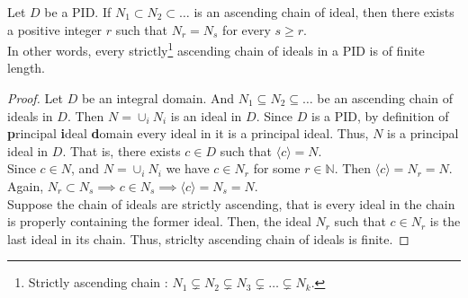 \begin{lemma}
	Let $D$ be a PID.
	If $N_1 \subset N_2 \subset \dots$ is an ascending chain of ideal, then there exists a positive integer $r$ such that $N_r = N_s$ for every $s \ge r$.\\

	In other words, every strictly\dag\footnote{
		Strictly ascending chain : $N_1 \subsetneq N_2 \subsetneq N_3 \subsetneq \dots \subsetneq N_k$.}
	ascending chain of ideals in a PID is of finite length.
\end{lemma}
\begin{proof}
	Let $D$ be an integral domain.
	And $N_1 \subseteq N_2 \subseteq \dots$ be an ascending chain of ideals in $D$.
	Then $N = \cup_i N_i$ is an ideal in $D$.
	Since $D$ is a PID, by definition of \textbf{p}rincipal \textbf{i}deal \textbf{d}omain every ideal in it is a principal ideal.
	Thus, $N$ is a principal ideal in $D$.
	That is, there exists $c \in D$ such that $\langle c \rangle = N$.\\

	Since $c \in N$, and $N = \cup_i N_i$ we have $c \in N_r$ for some $r \in \mathbb{N}$.
	Then $\langle c \rangle = N_r = N$.
	Again, $N_r \subset N_s \implies c \in N_s \implies \langle c \rangle = N_s = N$.\\

	Suppose the chain of ideals are strictly ascending, that is every ideal in the chain is properly containing the former ideal.
	Then, the ideal $N_r$ such that $c \in N_r$ is the last ideal in its chain.
	Thus, striclty ascending chain of ideals is finite.
\end{proof}

